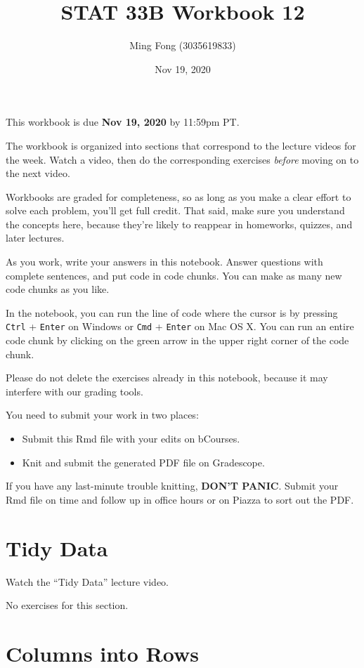\documentclass[
]{article}
\title{STAT 33B Workbook 12}
\author{Ming Fong (3035619833)}
\date{Nov 19, 2020}
\providecommand{\tightlist}{%
  \setlength{\itemsep}{0pt}\setlength{\parskip}{0pt}}
\begin{document}
\maketitle

This workbook is due \textbf{Nov 19, 2020} by 11:59pm PT.

The workbook is organized into sections that correspond to the lecture
videos for the week. Watch a video, then do the corresponding exercises
\emph{before} moving on to the next video.

Workbooks are graded for completeness, so as long as you make a clear
effort to solve each problem, you'll get full credit. That said, make
sure you understand the concepts here, because they're likely to
reappear in homeworks, quizzes, and later lectures.

As you work, write your answers in this notebook. Answer questions with
complete sentences, and put code in code chunks. You can make as many
new code chunks as you like.

In the notebook, you can run the line of code where the cursor is by
pressing \texttt{Ctrl} + \texttt{Enter} on Windows or \texttt{Cmd} +
\texttt{Enter} on Mac OS X. You can run an entire code chunk by clicking
on the green arrow in the upper right corner of the code chunk.

Please do not delete the exercises already in this notebook, because it
may interfere with our grading tools.

You need to submit your work in two places:

\begin{itemize}
\tightlist
\item
  Submit this Rmd file with your edits on bCourses.
\item
  Knit and submit the generated PDF file on Gradescope.
\end{itemize}

If you have any last-minute trouble knitting, \textbf{DON'T PANIC}.
Submit your Rmd file on time and follow up in office hours or on Piazza
to sort out the PDF.

\hypertarget{tidy-data}{%
\section{Tidy Data}\label{tidy-data}}

Watch the ``Tidy Data'' lecture video.

No exercises for this section.

\hypertarget{columns-into-rows}{%
\section{Columns into Rows}\label{columns-into-rows}}
\end{document}
